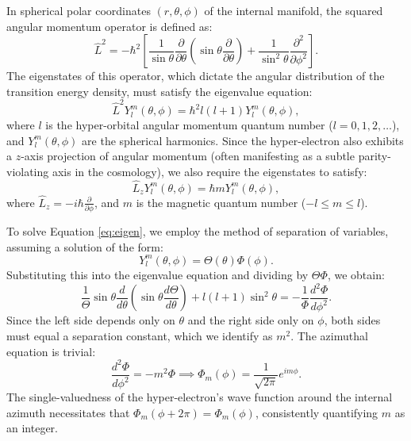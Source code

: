 In spherical polar coordinates $(r, \theta, \phi)$ of the internal manifold, the squared angular momentum operator is defined as:
\begin{equation}
\hat{L}^2 = -\hbar^2 \left[ \frac{1}{\sin\theta} \frac{\partial}{\partial \theta} \left( \sin\theta \frac{\partial}{\partial \theta} \right) + \frac{1}{\sin^2\theta} \frac{\partial^2}{\partial \phi^2} \right].
\end{equation}
The eigenstates of this operator, which dictate the angular distribution of the transition energy density, must satisfy the eigenvalue equation:
\begin{equation}
\hat{L}^2 Y_l^m(\theta, \phi) = \hbar^2 l(l+1) Y_l^m(\theta, \phi), \label{eq:eigen}
\end{equation}
where $l$ is the hyper-orbital angular momentum quantum number ($l = 0, 1, 2, \dots$), and $Y_l^m(\theta, \phi)$ are the spherical harmonics. Since the hyper-electron also exhibits a $z$-axis projection of angular momentum (often manifesting as a subtle parity-violating axis in the cosmology), we also require the eigenstates to satisfy:
\begin{equation}
\hat{L}_z Y_l^m(\theta, \phi) = \hbar m Y_l^m(\theta, \phi),
\end{equation}
where $\hat{L}_z = -i\hbar \frac{\partial}{\partial \phi}$, and $m$ is the magnetic quantum number ($-l \le m \le l$).

To solve Equation \ref{eq:eigen}, we employ the method of separation of variables, assuming a solution of the form:
\begin{equation}
Y_l^m(\theta, \phi) = \Theta(\theta) \Phi(\phi).
\end{equation}
Substituting this into the eigenvalue equation and dividing by $\Theta \Phi$, we obtain:
\begin{equation}
\frac{1}{\Theta} \sin\theta \frac{d}{d\theta} \left( \sin\theta \frac{d\Theta}{d\theta} \right) + l(l+1)\sin^2\theta = -\frac{1}{\Phi} \frac{d^2\Phi}{d\phi^2}.
\end{equation}
Since the left side depends only on $\theta$ and the right side only on $\phi$, both sides must equal a separation constant, which we identify as $m^2$. The azimuthal equation is trivial:
\begin{equation}
\frac{d^2\Phi}{d\phi^2} = -m^2 \Phi \implies \Phi_m(\phi) = \frac{1}{\sqrt{2\pi}} e^{im\phi}.
\end{equation}
The single-valuedness of the hyper-electron's wave function around the internal azimuth necessitates that $\Phi_m(\phi + 2\pi) = \Phi_m(\phi)$, consistently quantifying $m$ as an integer.

